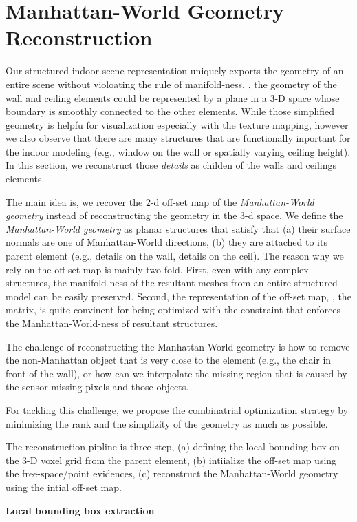 \section{Manhattan-World Geometry Reconstruction}
Our structured indoor scene representation uniquely exports the geometry of an entire scene without violoating the rule of manifold-ness, \ie, the geometry of the wall and ceiling elements could be represented by a plane in a 3-D space whose boundary is smoothly connected to the other elements. While those simplified geometry is helpfu for visualization especially with the texture mapping, however we also observe that there are many structures that are functionally inportant for the indoor modeling (e.g., window on the wall or spatially varying ceiling height). In this section, we reconstruct those {\it details} as childen of the walls and ceilings elements.

The main idea is, we recover the $2$-d off-set map of the {\it Manhattan-World geometry} instead of reconstructing the geometry in the 3-d space. We define the {\it Manhattan-World geometry} as planar structures that satisfy that (a) their surface normals are one of Manhattan-World directions, (b) they are attached to its parent element (e.g., details on the wall, details on the ceil). The reason why we rely on the off-set map is mainly two-fold. First, even with any complex structures, the manifold-ness of the resultant meshes from an entire structured model can be easily preserved. Second, the representation of the off-set map, \ie, the matrix, is quite convinent for being optimized with the constraint that enforces the Manhattan-World-ness of resultant structures.

The challenge of reconstructing the Manhattan-World geometry is how to remove the non-Manhattan object that is very close to the element (e.g., the chair in front of the wall), or how can we interpolate the missing region that is caused by the sensor missing pixels and those objects.

For tackling this challenge, we propose the combinatrial optimization strategy by minimizing the rank and the simplizity of the geometry as much as possible.

The reconstruction pipline is three-step, (a) defining the local bounding box on the 3-D voxel grid from the parent element, (b) intiialize the off-set map using the free-space/point evidences, (c) reconstruct the Manhattan-World geometry using the intial off-set map.

\noindent\textbf{Local bounding box extraction}

